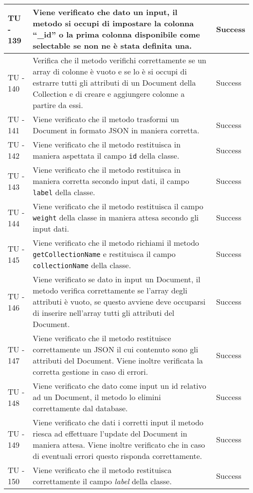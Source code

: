 \begin{center}
\begin{longtable}{ | p{3cm} | p{9cm} | p{2cm} | }
TU - 139 & Viene verificato che dato un input, il metodo si occupi di impostare la colonna ``\_id'' o la prima colonna disponibile come selectable se non ne è stata definita una. & Success \\ \hline
TU - 140 & Verifica che il metodo verifichi correttamente se un array di colonne è vuoto e se lo è si occupi di estrarre tutti gli attributi di un Document della Collection e di creare e aggiungere colonne a partire da essi. 
 & Success \\ \hline
TU - 141 & Viene verificato che il metodo trasformi un Document in formato JSON in maniera corretta. & Success \\ \hline
TU - 142 & Viene verificato che il metodo restituisca in maniera aspettata il campo \texttt{id} della classe. & Success \\ \hline
TU - 143 & Viene verificato che il metodo restituisca in maniera corretta secondo input dati, il campo \texttt{label} della classe. & Success \\ \hline
TU - 144 & Viene verificato che il metodo restituisca il campo \texttt{weight} della classe in maniera attesa secondo gli input dati. & Success \\ \hline
TU - 145 & Viene verificato che il metodo richiami il metodo  \texttt{getCollectionName} e restituisca il campo \texttt{collectionName} della classe. & Success \\ \hline
TU - 146 & Viene verificato se dato in input un Document, il metodo verifica correttamente se l'array degli attributi è vuoto, se questo avviene deve occuparsi di inserire nell'array tutti gli attributi del Document.
 & Success \\ \hline
TU - 147 & Viene verificato che il metodo restituisce correttamente un JSON il cui contenuto sono gli attributi del Document.
Viene inoltre verificata la corretta gestione in caso di errori.  & Success \\ \hline
TU - 148 & Viene verificato che dato come input un id relativo ad un Document, il metodo lo elimini correttamente dal database. & Success \\ \hline
TU - 149 & Viene verificato che dati i corretti input il metodo riesca ad effettuare l'update del Document in maniera attesa. Viene inoltre verificato che in caso di eventuali errori questo risponda correttamente. & Success \\ \hline
TU - 150 & Viene verificato che il metodo restituisca correttamente il campo \textit{label} della classe. & Success \\ \hline

\end{longtable}
\end{center}
